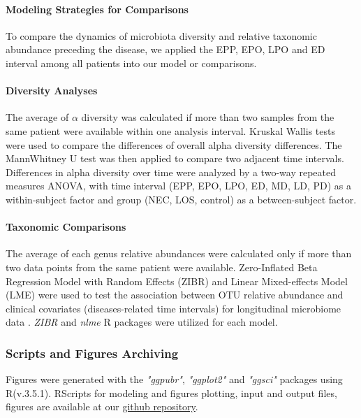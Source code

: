 \documentclass[fleqn,10pt, lineno]{wlpeerj} %
\begin{document}
      \paragraph*{Modeling Strategies for Comparisons}
      To compare the dynamics of microbiota diversity and relative taxonomic abundance preceding the disease, we applied the EPP, EPO, LPO and ED interval among all patients into our model or comparisons.

      \paragraph{Diversity Analyses}
      The average of $\alpha$  diversity was calculated if more than two samples from the same patient were available within one analysis interval.  Kruskal Wallis tests were used to compare the differences of overall alpha diversity differences. The Mann\-Whitney U test was then applied to compare two adjacent time intervals. Differences in alpha diversity over time were analyzed by a two-way repeated measures ANOVA, with time interval (EPP, EPO, LPO, ED, MD, LD, PD) as a within-subject factor and group (NEC, LOS, control) as a between-subject factor.

      \paragraph*{Taxonomic Comparisons}
      The average of each genus relative abundances were calculated only if more than two data points from the same patient were available. Zero-Inflated Beta Regression Model with Random Effects (ZIBR) and Linear Mixed-effects Model (LME) were used to test the association between OTU relative abundance and clinical covariates (diseases-related time intervals) for longitudinal microbiome data \citep{chen2016two}. \textit{ZIBR} and \textit{nlme}\citep{nlme} R packages were utilized for each model.

    \subsubsection*{Scripts and Figures Archiving}
    Figures were generated with the \textit{"ggpubr"}\citep{kassambara2017ggpubr},  \textit{"ggplot2"}\citep{ggplot2} and \textit{"ggsci"}\citep{ggsci} packages using R(v.3.5.1).
    RScripts for modeling and figures plotting, input and output files, figures are available at our \href{https://github.com/jiayiliujiayi/NEC-LOS-microbiota_pattern_comparison}{github repository}.
\end{document}
